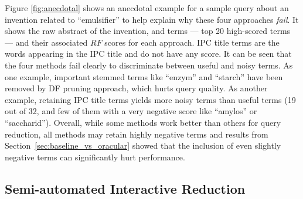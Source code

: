 
\vspace*{0.5mm}
Figure \ref{fig:anecdotal} shows an anecdotal example for a sample query about an invention related to ``emulsifier'' to help explain why these four approaches \emph{fail}. It shows the raw abstract of the invention, and terms --- top 20 high-scored terms --- and their associated $\mathit{RF}$ scores for each approach. IPC title terms are the words appearing in the IPC title and do not have any score.
It can be seen that the four methods fail clearly to discriminate between useful and noisy terms. As one example, important stemmed terms like ``enzym'' and ``starch'' have been removed by DF pruning approach, which hurts query quality.  As another example, retaining IPC title terms yields more noisy terms than useful terms (19 out of 32, and few of them with a very negative score like ``amylos'' or ``saccharid'').  Overall, while some methods work better than others for query reduction, all methods may retain highly negative terms and results from Section~\ref{sec:baseline_vs_oracular} showed that the inclusion of even slightly negative terms can significantly hurt performance.
 


\subsection{Semi-automated Interactive Reduction}

\label{sec:SemiAutomatedInteractiveReduction}

